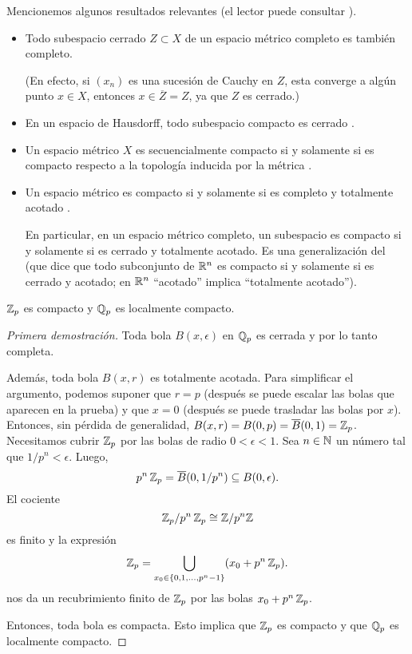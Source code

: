 \documentclass{article}
\numberwithin{equation}{section}
\theoremstyle{definition}
\begin{document}
Mencionemos algunos resultados relevantes (el lector puede consultar
\cite{Munkres-2000}).

\begin{itemize}
\item Todo subespacio cerrado $Z \subset X$ de un espacio métrico completo es
  también completo.

  (En efecto, si $(x_n)$ es una sucesión de Cauchy en $Z$, esta converge a algún
  punto $x\in X$, entonces $x\in \overline{Z} = Z$, ya que $Z$ es cerrado.)

\item En un espacio de Hausdorff, todo subespacio compacto es cerrado
  \cite[Theorem 26.3]{Munkres-2000}.

\item Un espacio métrico $X$ es secuencialmente compacto si y solamente si
  es compacto respecto a la topología inducida por la métrica
  \cite[Theorem 28.2]{Munkres-2000}.

\item Un espacio métrico es compacto si y solamente si es completo y totalmente
  acotado \cite[Theorem 45.1]{Munkres-2000}.

  En particular, en un espacio métrico completo, un subespacio es compacto
  si y solamente si es cerrado y totalmente acotado. Es una generalización
  del  (que dice que todo subconjunto de $\mathbb{R}^n$
  es compacto si y solamente si es cerrado y acotado; en $\mathbb{R}^n$ ``acotado''
  implica ``totalmente acotado'').
\end{itemize}

\begin{teorema}
  $\mathbb{Z}_p$ es compacto y $\mathbb{Q}_p$ es localmente compacto.
\end{teorema}

\begin{proof}[Primera demostración]
  Toda bola $B (x,\epsilon)$ en $\mathbb{Q}_p$ es cerrada y por lo tanto completa.

  Además, toda bola $B (x,r)$ es totalmente acotada. Para simplificar
  el argumento, podemos suponer que $r = p$ (después se puede escalar las bolas
  que aparecen en la prueba) y que $x = 0$ (después se puede trasladar las bolas
  por $x$). Entonces, sin pérdida de generalidad,
  $B (x,r) = B (0,p) = \overline{B} (0,1) = \mathbb{Z}_p$. Necesitamos cubrir $\mathbb{Z}_p$
  por las bolas de radio $0 < \epsilon < 1$. Sea $n\in\mathbb{N}$ un número tal que
  $1/p^n < \epsilon$. Luego,
  $$p^n\,\mathbb{Z}_p = \overline{B} (0,1/p^n) \subseteq B (0,\epsilon).$$
  El cociente
  $$\mathbb{Z}_p/p^n\,\mathbb{Z}_p \cong \mathbb{Z}/p^n\mathbb{Z}$$
  es finito y la expresión
  $$\mathbb{Z}_p = \bigcup_{x_0 \in \{ 0, 1, \ldots, p^n-1 \}} (x_0 + p^n\,\mathbb{Z}_p).$$
  nos da un recubrimiento finito de $\mathbb{Z}_p$ por las bolas $x_0 + p^n\,\mathbb{Z}_p$.

  Entonces, toda bola es compacta. Esto implica que $\mathbb{Z}_p$ es compacto y que
  $\mathbb{Q}_p$ es localmente compacto.
\end{proof}
\end{document}
